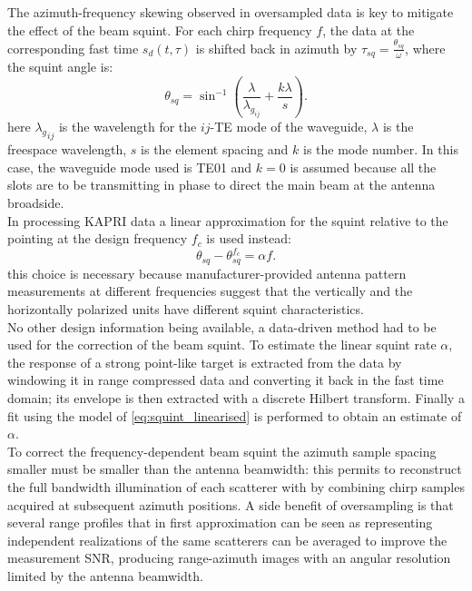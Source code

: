 The azimuth-frequency skewing observed in oversampled data is key to mitigate the effect of the beam squint. For each chirp frequency $f$, the data at the corresponding fast time $s_{d}\left(t,\tau\right)$ is shifted back in azimuth by $\tau_{sq}=\frac{\theta_{sq}}{\omega}$, where the squint angle is:
\begin{equation}\label{eq:squint_exact}
	\theta_{sq} = \sin^{-1}\left(\frac{\lambda}{\lambda_{g_{ij}}} + \frac{k \lambda}{s}\right).
\end{equation}
here ${\lambda_g}_{ij}$ is the wavelength for the $ij$-TE mode of the waveguide, $\lambda$ is the freespace wavelength, $s$ is the element spacing and $k$ is the mode number. In this case, the waveguide mode used is TE01 and $k=0$ is assumed because all the slots are to be transmitting in phase\cite{kraus88} to direct the main beam at the antenna broadside.\\
In processing KAPRI data a linear approximation for the squint relative to the pointing at the design frequency $f_c$ is used instead:
\begin{equation}\label{eq:squint_linearised}
	\theta_{sq} - \theta_{sq}^{f_{c}}  =  \alpha f.
\end{equation}
this choice is necessary because manufacturer-provided antenna pattern measurements at different frequencies suggest that the vertically and the horizontally polarized units have different squint characteristics.\\ No other design information being available, a data-driven method had to be used for the correction of the beam squint. To estimate the linear squint rate $\alpha$, the response of a strong point-like target is extracted from the data by windowing it in range compressed data and converting it back in the fast time domain; its envelope is then extracted with a discrete Hilbert transform. Finally a fit using the model of \autoref{eq:squint_linearised} is performed to obtain an estimate of $\alpha$.\\
To correct the frequency-dependent beam squint the azimuth sample spacing smaller must be smaller than the antenna beamwidth: this permits to reconstruct the full bandwidth illumination of each scatterer with by combining chirp samples acquired at subsequent azimuth positions. A side benefit of oversampling is that several range profiles that in first approximation can be seen as representing independent realizations of the same scatterers can be averaged to improve the measurement SNR, producing range-azimuth images with an angular resolution limited by the antenna beamwidth.\\

